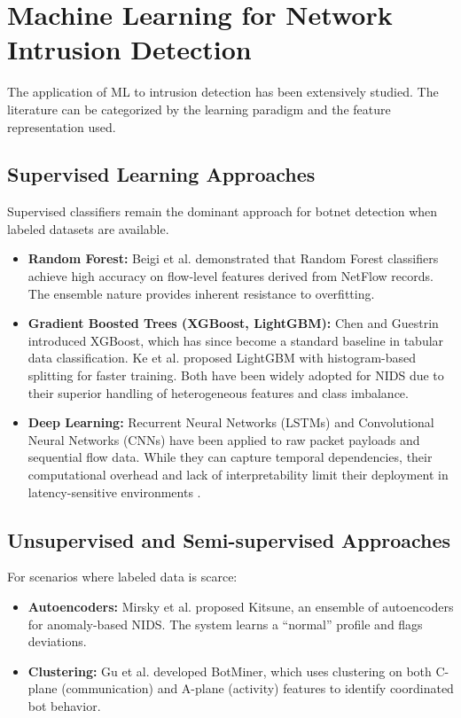 \section{Machine Learning for Network Intrusion Detection}

The application of ML to intrusion detection has been extensively studied. The literature can be categorized by the learning paradigm and the feature representation used.

\subsection{Supervised Learning Approaches}

Supervised classifiers remain the dominant approach for botnet detection when labeled datasets are available.

\begin{itemize}
    \item \textbf{Random Forest:} Beigi et al. \cite{beigi2014towards} demonstrated that Random Forest classifiers achieve high accuracy on flow-level features derived from NetFlow records. The ensemble nature provides inherent resistance to overfitting.
    \item \textbf{Gradient Boosted Trees (XGBoost, LightGBM):} Chen and Guestrin \cite{chen2016xgboost} introduced XGBoost, which has since become a standard baseline in tabular data classification. Ke et al. \cite{ke2017lightgbm} proposed LightGBM with histogram-based splitting for faster training. Both have been widely adopted for NIDS due to their superior handling of heterogeneous features and class imbalance.
    \item \textbf{Deep Learning:} Recurrent Neural Networks (LSTMs) and Convolutional Neural Networks (CNNs) have been applied to raw packet payloads and sequential flow data. While they can capture temporal dependencies, their computational overhead and lack of interpretability limit their deployment in latency-sensitive environments \cite{mirsky2018kitsune}.
\end{itemize}

\subsection{Unsupervised and Semi-supervised Approaches}

For scenarios where labeled data is scarce:
\begin{itemize}
    \item \textbf{Autoencoders:} Mirsky et al. \cite{mirsky2018kitsune} proposed Kitsune, an ensemble of autoencoders for anomaly-based NIDS. The system learns a ``normal'' profile and flags deviations.
    \item \textbf{Clustering:} Gu et al. \cite{gu2008botminer} developed BotMiner, which uses clustering on both C-plane (communication) and A-plane (activity) features to identify coordinated bot behavior.
\end{itemize}

